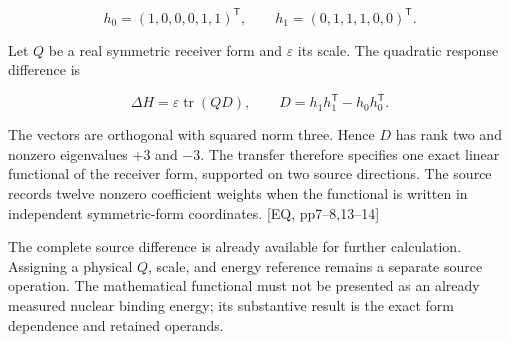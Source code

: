 \[
h_0=(1,0,0,0,1,1)^{\mathsf T},\qquad h_1=(0,1,1,1,0,0)^{\mathsf T}.
\]

Let \(Q\) be a real symmetric receiver form and \(\varepsilon\) its scale. The quadratic response difference is

\[
\Delta H=\varepsilon\operatorname{tr}(QD),\qquad D=h_1h_1^{\mathsf T}-h_0h_0^{\mathsf T}.
\]

The vectors are orthogonal with squared norm three. Hence \(D\) has rank two and nonzero eigenvalues +3 and −3. The transfer therefore specifies one exact linear functional of the receiver form, supported on two source directions. The source records twelve nonzero coefficient weights when the functional is written in independent symmetric-form coordinates. {[}EQ, pp7--8,13--14{]}

The complete source difference is already available for further calculation. Assigning a physical \(Q\), scale, and energy reference remains a separate source operation. The mathematical functional must not be presented as an already measured nuclear binding energy; its substantive result is the exact form dependence and retained operands.
